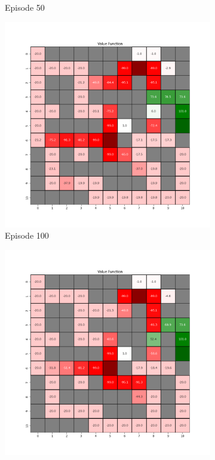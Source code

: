 \documentclass{assignment}
\begin{document}
\begin{figure}[H]
\begin{subfigure}{0.3\textwidth}
    \caption{Episode 50}
    \end{subfigure}\hfill
    \begin{subfigure}{0.3\textwidth}
        \includegraphics[width=\textwidth]{figures/value_td/alpha_sweep/value_function_alpha_1_gamma_0.95_epsilon_0.2_iteration_100.png}
    \caption{Episode 100}
    \end{subfigure}
    \begin{subfigure}{0.3\textwidth}
        \includegraphics[width=\textwidth]{figures/value_td/alpha_sweep/value_function_alpha_1_gamma_0.95_epsilon_0.2_iteration_1000.png}

\end{subfigure}
\end{figure}
\end{document}
